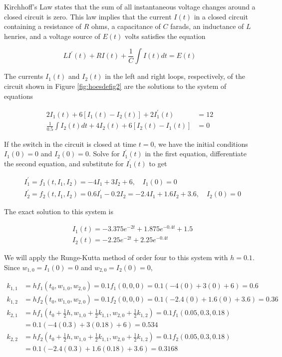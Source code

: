 \begin{example}
 Kirchhoff's Law states that the sum of all instantaneous voltage changes around a closed circuit is zero. This law implies that the current $I(t)$ in a closed circuit containing a resistance of $R$ ohms, a capacitance of $C$ farads, an inductance of $L$ henries, and a voltage source of $E(t)$ volts satisfies the equation

$$
L I^{\prime}(t)+R I(t)+\frac{1}{C} \int I(t) d t=E(t)
$$

The currents $I_{1}(t)$ and $I_{2}(t)$ in the left and right loops, respectively, of the circuit shown in Figure \ref{fig:hoesdefig2} are the solutions to the system of equations

$$
\begin{aligned}
2 I_{1}(t)+6\left[I_{1}(t)-I_{2}(t)\right]+2 I_{1}^{\prime}(t) & =12 \\
\frac{1}{0.5} \int I_{2}(t) d t+4 I_{2}(t)+6\left[I_{2}(t)-I_{1}(t)\right] & =0
\end{aligned}
$$

If the switch in the circuit is closed at time $t=0$, we have the initial conditions $I_{1}(0)=0$ and $I_{2}(0)=0$. Solve for $I_{1}^{\prime}(t)$ in the first equation, differentiate the second equation, and substitute for $I_{1}^{\prime}(t)$ to get

$$
\begin{aligned}
& I_{1}^{\prime}=f_{1}\left(t, I_{1}, I_{2}\right)=-4 I_{1}+3 I_{2}+6, \quad I_{1}(0)=0 \\
& I_{2}^{\prime}=f_{2}\left(t, I_{1}, I_{2}\right)=0.6 I_{1}^{\prime}-0.2 I_{2}=-2.4 I_{1}+1.6 I_{2}+3.6, \quad I_{2}(0)=0
\end{aligned}
$$

The exact solution to this system is

$$
\begin{aligned}
& I_{1}(t)=-3.375 e^{-2 t}+1.875 e^{-0.4 t}+1.5 \\
& I_{2}(t)=-2.25 e^{-2 t}+2.25 e^{-0.4 t}
\end{aligned}
$$

We will apply the Runge-Kutta method of order four to this system with $h=0.1$. Since $w_{1,0}=I_{1}(0)=0$ and $w_{2,0}=I_{2}(0)=0$,

$$
\begin{aligned}
k_{1,1} & =h f_{1}\left(t_{0}, w_{1,0}, w_{2,0}\right)=0.1 f_{1}(0,0,0)=0.1(-4(0)+3(0)+6)=0.6 \\
k_{1,2} & =h f_{2}\left(t_{0}, w_{1,0}, w_{2,0}\right)=0.1 f_{2}(0,0,0)=0.1(-2.4(0)+1.6(0)+3.6)=0.36 \\
k_{2,1} & =h f_{1}\left(t_{0}+\frac{1}{2} h, w_{1,0}+\frac{1}{2} k_{1,1}, w_{2,0}+\frac{1}{2} k_{1,2}\right)=0.1 f_{1}(0.05,0.3,0.18) \\
& =0.1(-4(0.3)+3(0.18)+6)=0.534 \\
k_{2,2} & =h f_{2}\left(t_{0}+\frac{1}{2} h, w_{1,0}+\frac{1}{2} k_{1,1}, w_{2,0}+\frac{1}{2} k_{1,2}\right)=0.1 f_{2}(0.05,0.3,0.18) \\
& =0.1(-2.4(0.3)+1.6(0.18)+3.6)=0.3168
\end{aligned}
$$


\end{example}
